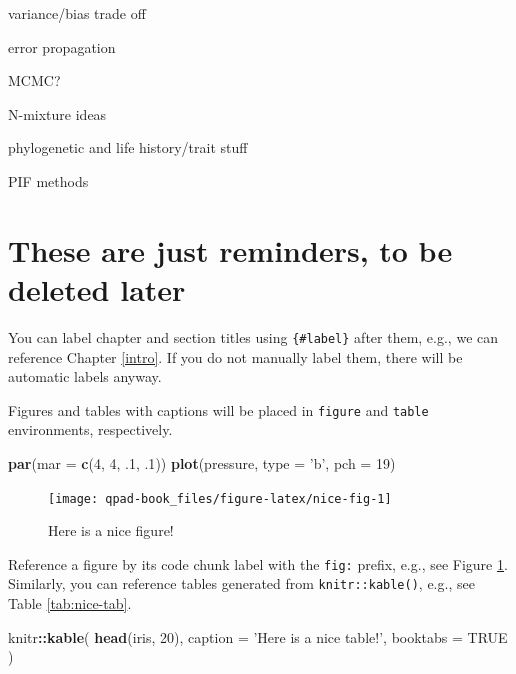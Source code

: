 \documentclass[12pt,]{book}
\newenvironment{Shaded}{\begin{snugshade}}{\end{snugshade}}
\newcommand{\DataTypeTok}[1]{\textcolor[rgb]{0.13,0.29,0.53}{#1}}
\newcommand{\DecValTok}[1]{\textcolor[rgb]{0.00,0.00,0.81}{#1}}
\newcommand{\FloatTok}[1]{\textcolor[rgb]{0.00,0.00,0.81}{#1}}
\newcommand{\KeywordTok}[1]{\textcolor[rgb]{0.13,0.29,0.53}{\textbf{#1}}}
\newcommand{\NormalTok}[1]{#1}
\newcommand{\OperatorTok}[1]{\textcolor[rgb]{0.81,0.36,0.00}{\textbf{#1}}}
\newcommand{\OtherTok}[1]{\textcolor[rgb]{0.56,0.35,0.01}{#1}}
\newcommand{\StringTok}[1]{\textcolor[rgb]{0.31,0.60,0.02}{#1}}
\begin{document}
variance/bias trade off

error propagation

MCMC?

N-mixture ideas

phylogenetic and life history/trait stuff

PIF methods

\hypertarget{these-are-just-reminders-to-be-deleted-later}{%
\section*{These are just reminders, to be deleted later}\label{these-are-just-reminders-to-be-deleted-later}}

You can label chapter and section titles using \texttt{\{\#label\}} after them, e.g., we can reference Chapter \ref{intro}. If you do not manually label them, there will be automatic labels anyway.

Figures and tables with captions will be placed in \texttt{figure} and \texttt{table} environments, respectively.

\begin{Shaded}
\begin{Highlighting}[]
\KeywordTok{par}\NormalTok{(}\DataTypeTok{mar =} \KeywordTok{c}\NormalTok{(}\DecValTok{4}\NormalTok{, }\DecValTok{4}\NormalTok{, }\FloatTok{.1}\NormalTok{, }\FloatTok{.1}\NormalTok{))}
\KeywordTok{plot}\NormalTok{(pressure, }\DataTypeTok{type =} \StringTok{'b'}\NormalTok{, }\DataTypeTok{pch =} \DecValTok{19}\NormalTok{)}
\end{Highlighting}
\end{Shaded}

\begin{figure}

{\centering \texttt{[image: qpad-book\_files/figure-latex/nice-fig-1]} 

}

\caption{Here is a nice figure!}\label{fig:nice-fig}
\end{figure}

Reference a figure by its code chunk label with the \texttt{fig:} prefix, e.g., see Figure \ref{fig:nice-fig}. Similarly, you can reference tables generated from \texttt{knitr::kable()}, e.g., see Table \ref{tab:nice-tab}.

\begin{Shaded}
\begin{Highlighting}[]
\NormalTok{knitr}\OperatorTok{::}\KeywordTok{kable}\NormalTok{(}
  \KeywordTok{head}\NormalTok{(iris, }\DecValTok{20}\NormalTok{), }\DataTypeTok{caption =} \StringTok{'Here is a nice table!'}\NormalTok{,}
  \DataTypeTok{booktabs =} \OtherTok{TRUE}
\NormalTok{)}
\end{Highlighting}
\end{Shaded}
\end{document}
